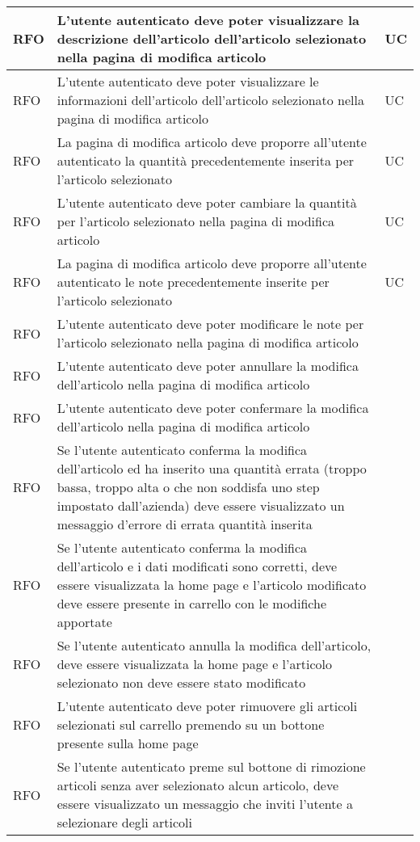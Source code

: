 \begin{center}
\begin{longtable}{ | >{\centering\arraybackslash}m{2.5cm} | >{\centering\arraybackslash}m{8cm} | >{\centering\arraybackslash}m{2.5cm} | }
RFO & L'utente autenticato deve poter visualizzare la descrizione dell'articolo dell'articolo selezionato nella pagina di modifica articolo & UC \\ \hline
RFO & L'utente autenticato deve poter visualizzare le informazioni dell'articolo dell'articolo selezionato nella pagina di modifica articolo & UC \\ \hline
RFO & La pagina di modifica articolo deve proporre all'utente autenticato la quantità precedentemente inserita per l'articolo selezionato & UC \\ \hline
RFO & L'utente autenticato deve poter cambiare la quantità per l'articolo selezionato nella pagina di modifica articolo & UC \\ \hline
RFO & La pagina di modifica articolo deve proporre all'utente autenticato le note precedentemente inserite per l'articolo selezionato & UC \\ \hline
RFO & L'utente autenticato deve poter modificare le note per l'articolo selezionato nella pagina di modifica articolo & \\ \hline
RFO & L'utente autenticato deve poter annullare la modifica dell'articolo nella pagina di modifica articolo & \\ \hline
RFO & L'utente autenticato deve poter confermare la modifica dell'articolo nella pagina di modifica articolo & \\ \hline
RFO & Se l'utente autenticato conferma la modifica dell'articolo ed ha inserito una quantità errata (troppo bassa, troppo alta o che non soddisfa uno step impostato dall'azienda) deve essere visualizzato un messaggio d'errore di errata quantità inserita & \\ \hline
RFO & Se l'utente autenticato conferma la modifica dell'articolo e i dati modificati sono corretti, deve essere visualizzata la home page e l'articolo modificato deve essere presente in carrello con le modifiche apportate & \\ \hline
RFO & Se l'utente autenticato annulla la modifica dell'articolo, deve essere visualizzata la home page e l'articolo selezionato non deve essere stato modificato & \\ \hline
RFO & L'utente autenticato deve poter rimuovere gli articoli selezionati sul carrello premendo su un bottone presente sulla home page & \\ \hline
RFO & Se l'utente autenticato preme sul bottone di rimozione articoli senza aver selezionato alcun articolo, deve essere visualizzato un messaggio che inviti l'utente a selezionare degli articoli & \\ \hline

\end{longtable}
\end{center}
